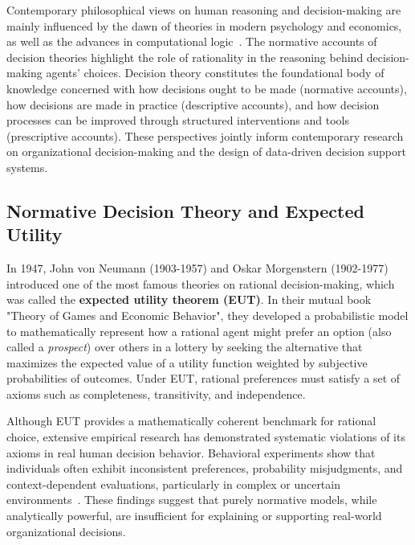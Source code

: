 \documentclass{sfuthesis}
\begin{document}
Contemporary philosophical views on human reasoning and decision-making are mainly influenced by the dawn of theories in modern psychology and economics, as well as the advances in computational logic~\cite{steele_decision_2020}. The normative accounts of decision theories highlight the role of rationality in the reasoning behind decision-making agents’ choices. Decision theory constitutes the foundational body of knowledge concerned with how decisions ought to be made (normative accounts), how decisions are made in practice (descriptive accounts), and how decision processes can be improved through structured interventions and tools (prescriptive accounts). These perspectives jointly inform contemporary research on organizational decision-making and the design of data-driven decision support systems.
\subsection{Normative Decision Theory and Expected Utility}
In 1947, John von Neumann (1903-1957) and Oskar Morgenstern (1902-1977) introduced one of the most famous theories on rational decision-making, which was called the \textbf{expected utility theorem (EUT)}. In their mutual book "Theory of Games and Economic Behavior", they developed a probabilistic model to mathematically represent how a rational agent might prefer an option (also called a \textit{prospect}) over others in a lottery by seeking the alternative that maximizes the expected value of a utility function weighted by subjective probabilities of outcomes. Under EUT, rational preferences must satisfy a set of axioms such as completeness, transitivity, and independence.\par
Although EUT provides a mathematically coherent benchmark for rational choice, extensive empirical research has demonstrated systematic violations of its axioms in real human decision behavior. Behavioral experiments show that individuals often exhibit inconsistent preferences, probability misjudgments, and context-dependent evaluations, particularly in complex or uncertain environments~\cite{edwards_behavioral_1961, briggs_normative_2014}. These findings suggest that purely normative models, while analytically powerful, are insufficient for explaining or supporting real-world organizational decisions.
\end{document}
